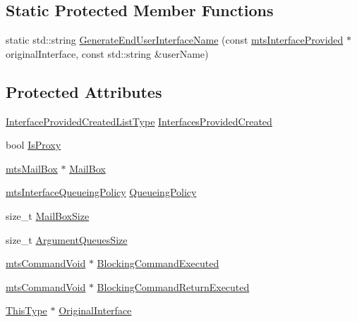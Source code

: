 \subsection*{Static Protected Member Functions}
\begin{DoxyCompactItemize}
\item 
static std\+::string \hyperlink{classmts_interface_provided_a8d07c765ba8331aa2867540176e4e8ad}{Generate\+End\+User\+Interface\+Name} (const \hyperlink{classmts_interface_provided}{mts\+Interface\+Provided} $\ast$original\+Interface, const std\+::string \&user\+Name)
\end{DoxyCompactItemize}
\subsection*{Protected Attributes}
\begin{DoxyCompactItemize}
\item 
\hyperlink{classmts_interface_provided_ae16c05b551c38856866c199bc4551b98}{Interface\+Provided\+Created\+List\+Type} \hyperlink{classmts_interface_provided_abb4914957812afdf0fd27c620cd609a4}{Interfaces\+Provided\+Created}
\item 
bool \hyperlink{classmts_interface_provided_ae1d453e5968c61939ab1a7b8a94389f0}{Is\+Proxy}
\item 
\hyperlink{classmts_mail_box}{mts\+Mail\+Box} $\ast$ \hyperlink{classmts_interface_provided_a99b2ef9d3dec51002e722415589628bb}{Mail\+Box}
\item 
\hyperlink{mts_forward_declarations_8h_abedfb5c45b329a89b0fb647a96a7c938}{mts\+Interface\+Queueing\+Policy} \hyperlink{classmts_interface_provided_aa46d6cd890786ba31c40c8e7882fc9a3}{Queueing\+Policy}
\item 
size\+\_\+t \hyperlink{classmts_interface_provided_a5defbf0829c6a36bbf33baf52ec8f2f0}{Mail\+Box\+Size}
\item 
size\+\_\+t \hyperlink{classmts_interface_provided_ab339fc699adb6b5fcf1b6dbc6369bfac}{Argument\+Queues\+Size}
\item 
\hyperlink{classmts_command_void}{mts\+Command\+Void} $\ast$ \hyperlink{classmts_interface_provided_aa67f46f7ce844bfe7d12f7865b3b4402}{Blocking\+Command\+Executed}
\item 
\hyperlink{classmts_command_void}{mts\+Command\+Void} $\ast$ \hyperlink{classmts_interface_provided_a289d8c80b245bfb5ff2a0bd17b861702}{Blocking\+Command\+Return\+Executed}
\item 
\hyperlink{classmts_interface_provided_a487e1de997186e03ed38d365592fd180}{This\+Type} $\ast$ \hyperlink{classmts_interface_provided_aa3c7fd4efc804d522edf06f02aaf646e}{Original\+Interface}

\end{DoxyCompactItemize}
